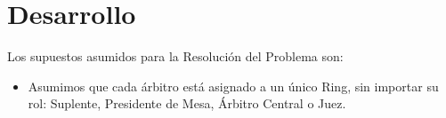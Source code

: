 \section{Desarrollo}

Los supuestos asumidos para la Resoluci\'on del Problema son:

\begin{itemize}
\item Asumimos que cada \'arbitro est\'a asignado a un \'unico Ring, sin importar su rol: Suplente, Presidente de Mesa, \'Arbitro Central o Juez.
\end{itemize}
